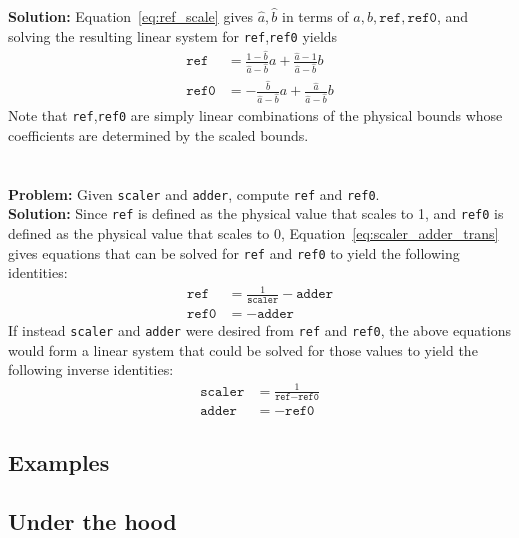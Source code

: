 \documentclass{article}
\begin{document}
\noindent
\textbf{Solution:} Equation~\eqref{eq:ref_scale} gives $\hat{a},\hat{b}$ in terms of $a,b,\texttt{ref},\texttt{ref0}$, and solving the resulting linear system for \texttt{ref},\texttt{ref0} yields
\begin{align*}
    \texttt{ref} &= \frac{1-\hat{b}}{\hat{a}-\hat{b}}a + \frac{\hat{a}-1}{\hat{a}-\hat{b}}b \\
    \texttt{ref0} &= -\frac{\hat{b}}{\hat{a}-\hat{b}}a + \frac{\hat{a}}{\hat{a}-\hat{b}}b
\end{align*}
Note that \texttt{ref},\texttt{ref0} are simply linear combinations of the physical bounds whose coefficients are determined by the scaled bounds. \\
\\ \\
\noindent
\textbf{Problem:} Given \texttt{scaler} and \texttt{adder}, compute \texttt{ref} and \texttt{ref0}. \\

\noindent
\textbf{Solution:} Since \texttt{ref} is defined as the physical value that scales to 1, and \texttt{ref0} is defined as the physical value that scales to 0, Equation~\eqref{eq:scaler_adder_trans} gives equations that can be solved for \texttt{ref} and \texttt{ref0} to yield the following identities:
\begin{align*}
    \texttt{ref} &= \frac{1}{\texttt{scaler}} - \texttt{adder} \\
    \texttt{ref0} &= -\texttt{adder}
\end{align*}
If instead \texttt{scaler} and \texttt{adder} were desired from \texttt{ref} and \texttt{ref0}, the above equations would form a linear system that could be solved for those values to yield the following inverse identities:
\begin{align*}
    \texttt{scaler} &= \frac{1}{\texttt{ref} - \texttt{ref0}} \\
    \texttt{adder} &= -\texttt{ref0}
\end{align*}

\subsection*{Examples}

\subsection*{Under the hood}
\end{document}
